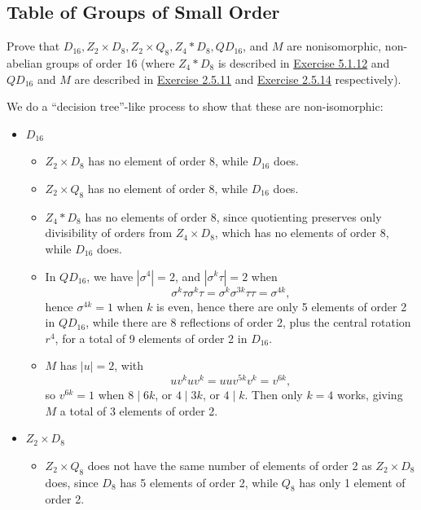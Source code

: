 \newpage

\subsection{Table of Groups of Small Order}

\begin{exercise}\label{ex5.3.1}
    Prove that $D_{16}, Z_2 \times D_8, Z_2 \times Q_8, Z_4 * D_8, QD_{16}$, and $M$ are nonisomorphic, non-abelian groups of order 16 (where $Z_4 * D_8$ is described in \hyperref[ex5.1.12]{Exercise 5.1.12} and $QD_{16}$ and $M$ are described in \hyperref[ex2.5.11]{Exercise 2.5.11} and \hyperref[ex2.5.14]{Exercise 2.5.14} respectively).
\end{exercise}

\begin{sol}
    We do a ``decision tree''-like process to show that these are non-isomorphic:
    \begin{itemize}
        \item $D_{16}$
        \begin{itemize}
            \item $Z_2 \times D_8$ has no element of order 8, while $D_{16}$ does.
            \item $Z_2 \times Q_8$ has no element of order 8, while $D_{16}$ does.
            \item $Z_4 * D_8$ has no elements of order 8, since quotienting preserves only divisibility of orders from $Z_4 \times D_8$, which has no elements of order 8, while $D_{16}$ does.
            \item In $QD_{16}$, we have $|\sigma^4| = 2$, and $|\sigma^k\tau| = 2$ when
            \[\sigma^k\tau\sigma^k\tau = \sigma^k\sigma^{3k}\tau\tau = \sigma^{4k},\]
            hence $\sigma^{4k} = 1$ when $k$ is even, hence there are only 5 elements of order 2 in $QD_{16}$, while there are 8 reflections of order 2, plus the central rotation $r^4$, for a total of 9 elements of order 2 in $D_{16}$.
            \item $M$ has $|u| = 2$, with
            \[uv^kuv^k = uuv^{5k}v^k = v^{6k},\]
            so $v^{6k} = 1$ when $8 \mid 6k$, or $4 \mid 3k$, or $4 \mid k$. Then only $k = 4$ works, giving $M$ a total of 3 elements of order 2.
        \end{itemize}
        \item $Z_2 \times D_8$
        \begin{itemize}
            \item $Z_2 \times Q_8$ does not have the same number of elements of order 2 as $Z_2 \times D_8$ does, since $D_8$ has 5 elements of order 2, while $Q_8$ has only 1 element of order 2.

\end{itemize}
\end{itemize}
\end{sol}
